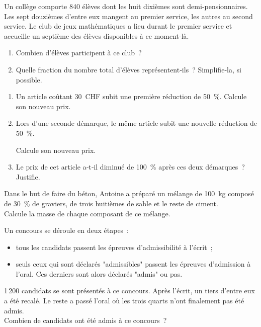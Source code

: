 \begin{exercice}
Un collège comporte 840 élèves dont les huit dixièmes sont demi‑pensionnaires. \\[0.5em]
Les sept douzièmes d'entre eux mangent au premier service, les autres au second service. Le club de jeux mathématiques a lieu durant le premier service et accueille un septième des élèves disponibles à ce moment-là.
\begin{enumerate}
 \item Combien d'élèves participent à ce club ?
 \item Quelle fraction du nombre total d'élèves représentent‑ils ? Simplifie‑la, si possible.
 \end{enumerate}
\end{exercice}



\begin{exercice}
\begin{enumerate}
 \item Un article coûtant 30 CHF subit une première réduction de 50 \%. Calcule son nouveau prix.
 \item Lors d'une seconde démarque, le même article subit une nouvelle réduction de 50 \%.
 
Calcule son nouveau prix.
 \item Le prix de cet article a‑t‑il diminué de 100 \% après ces deux démarques ? Justifie.
 \end{enumerate}
\end{exercice}



\begin{exercice}
Dans le but de faire du béton, Antoine a préparé un mélange de 100 kg composé de 30 \% de graviers, de trois huitièmes de sable et le reste de ciment. \\
Calcule la masse de chaque composant de ce mélange.
\end{exercice}


\begin{exercice}[Le concours]
Un concours se déroule en deux étapes : 
\begin{itemize}
 \item tous les candidats passent les épreuves d'admissibilité à l'écrit ;
 \item seuls ceux qui sont déclarés "admissibles" passent les épreuves d'admission à l'oral. Ces derniers sont alors déclarés "admis" ou pas.
 \end{itemize}
1\,200 candidats se sont présentés à ce concours. Après l'écrit, un tiers d'entre eux a été recalé. Le reste a passé l'oral où les trois quarts n'ont finalement pas été admis. \\[0.5em]
Combien de candidats ont été admis à ce concours ?
\end{exercice}


